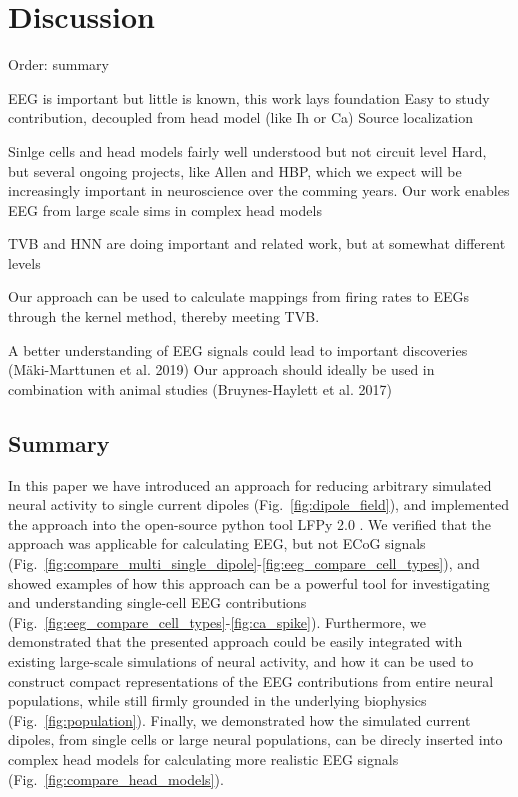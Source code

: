 \documentclass[preprint,10pt,authoryear]{elsarticle}
\newcommand{\hlg}[2][Emerald]{ {\sethlcolor{#1} \hl{#2}} }
\newcommand{\tvnnote}[1]{\color{white}{\hlg{TVN: #1 }}\color{black}}
\begin{document}
\section{Discussion}\label{sec:discussion}
Order:
summary

EEG is important but little is known, this work lays foundation
Easy to study contribution, decoupled from head model (like Ih or Ca)
Source localization

Sinlge cells and head models fairly well understood but not circuit level
Hard, but several ongoing projects, like Allen and HBP, which we expect will be increasingly important in neuroscience over the comming years.
Our work enables EEG from large scale sims in complex head models

TVB and HNN are doing important and related work, but at somewhat different levels

Our approach can be used to calculate mappings from firing rates to EEGs through the kernel method, thereby meeting TVB.

A better understanding of EEG signals could lead to important discoveries (Mäki-Marttunen et al. 2019)
Our approach should ideally be used in combination with animal studies (Bruynes-Haylett et al. 2017)

\subsection*{Summary}
In this paper we have introduced an approach for reducing arbitrary simulated neural activity to single current dipoles (Fig.~\ref{fig:dipole_field}), and implemented the approach into the open-source python tool LFPy 2.0 \citep{HAGEN2018}. We verified that the approach was applicable for calculating EEG, but not ECoG signals (Fig.~\ref{fig:compare_multi_single_dipole}-\ref{fig:eeg_compare_cell_types}), and showed examples of how this approach can be a powerful tool for investigating and understanding single-cell EEG contributions (Fig.~\ref{fig:eeg_compare_cell_types}-\ref{fig:ca_spike}). Furthermore, we demonstrated that the presented approach could be easily integrated with existing large-scale simulations of neural activity, and how it can be used to construct compact representations of the EEG contributions from entire neural populations, while still firmly grounded in the underlying biophysics (Fig.~\ref{fig:population}). Finally, we demonstrated how the simulated current dipoles, from single cells or large neural populations, can be direcly inserted into complex head models for calculating more realistic EEG signals (Fig.~\ref{fig:compare_head_models}).
\end{document}
